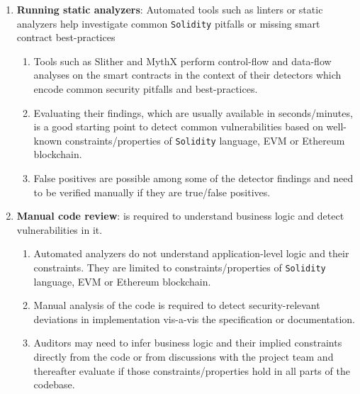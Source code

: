 \begin{enumerate}
\item\textbf{Running static analyzers}: Automated tools such as linters or static analyzers help investigate common \verb|Solidity| pitfalls or missing smart contract best-practices
	\begin{enumerate}
	\item Tools such as Slither and MythX perform control-flow and data-flow analyses on the smart contracts in the context of their detectors which encode common security pitfalls and best-practices.
	\item Evaluating their findings, which are usually available in seconds/minutes, is a good starting point to detect common vulnerabilities based on well-known constraints/properties of \verb|Solidity| language, EVM or Ethereum blockchain.
	\item False positives are possible among some of the detector findings and need to be verified manually if they are true/false positives.
	\end{enumerate}

\item\textbf{Manual code review}: is required to understand business logic and detect vulnerabilities in it.
	\begin{enumerate}
	\item Automated analyzers do not understand application-level logic and their constraints. They are limited to constraints/properties of \verb|Solidity| language, EVM or Ethereum blockchain.
	\item Manual analysis of the code is required to detect security-relevant deviations in implementation vis-a-vis the specification or documentation.
	\item Auditors may need to infer business logic and their implied constraints directly from the code or from discussions with the project team and thereafter evaluate if those constraints/properties hold in all parts of the codebase.
	\end{enumerate}


\end{enumerate}
